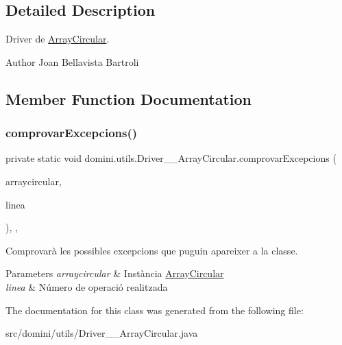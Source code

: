 \subsection{Detailed Description}
Driver de \hyperlink{classdomini_1_1utils_1_1ArrayCircular}{Array\+Circular}. 

\begin{DoxyAuthor}{Author}
Joan Bellavista Bartroli 
\end{DoxyAuthor}


\subsection{Member Function Documentation}
\mbox{\label{classdomini_1_1utils_1_1Driver____ArrayCircular_a0f5f42c5ace9176cfcae4dfe9717f380}} 
\subsubsection{\texorpdfstring{comprovar\+Excepcions()}{comprovarExcepcions()}}
{\footnotesize\ttfamily private static void domini.\+utils.\+Driver\+\_\+\+\_\+\+Array\+Circular.\+comprovar\+Excepcions (\begin{DoxyParamCaption}\item[{\hyperlink{classdomini_1_1utils_1_1ArrayCircular}{Array\+Circular}}]{arraycircular,  }\item[{String}]{linea }\end{DoxyParamCaption})\hspace{0.3cm}{\ttfamily [inline]}, {\ttfamily [static]}, {\ttfamily [private]}}



Comprovarà les possibles excepcions que puguin apareixer a la classe. 


\begin{DoxyParams}{Parameters}
{\em arraycircular} & Instància \hyperlink{classdomini_1_1utils_1_1ArrayCircular}{Array\+Circular} \\
\hline
{\em linea} & Número de operació realitzada \\
\hline
\end{DoxyParams}


The documentation for this class was generated from the following file\+:\begin{DoxyCompactItemize}
\item 
src/domini/utils/Driver\+\_\+\+\_\+\+Array\+Circular.\+java\end{DoxyCompactItemize}
